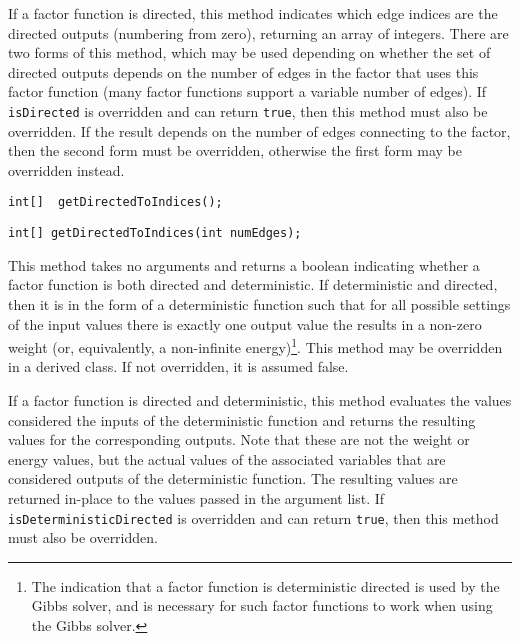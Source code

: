 
If a factor function is directed, this method indicates which edge indices are the directed outputs (numbering from zero), returning an array of integers.  There are two forms of this method, which may be used depending on whether the set of directed outputs depends on the number of edges in the factor that uses this factor function (many factor functions support a variable number of edges).  If \texttt{isDirected} is overridden and can return \texttt{true}, then this method must also be overridden.  If the result depends on the number of edges connecting to the factor, then the second form must be overridden, otherwise the first form may be overridden instead.

\begin{lstlisting}
int[]  getDirectedToIndices();
\end{lstlisting}

\begin{lstlisting}
int[] getDirectedToIndices(int numEdges);
\end{lstlisting}


This method takes no arguments and returns a boolean indicating whether a factor function is both directed and deterministic.  If deterministic and directed, then it is in the form of a deterministic function such that for all possible settings of the input values there is exactly one output value the results in a non-zero weight (or, equivalently, a non-infinite energy)\footnote{The indication that a factor function is deterministic directed is used by the Gibbs solver, and is necessary for such factor functions to work when using the Gibbs solver.}.  This method may be overridden in a derived class.  If not overridden, it is assumed false.


If a factor function is directed and deterministic, this method evaluates the values considered the inputs of the deterministic function and returns the resulting values for the corresponding outputs.  Note that these are not the weight or energy values, but the actual values of the associated variables that are considered outputs of the deterministic function.  The resulting values are returned in-place to the values passed in the argument list.  If \texttt{isDeterministicDirected} is overridden and can return \texttt{true}, then this method must also be overridden.


